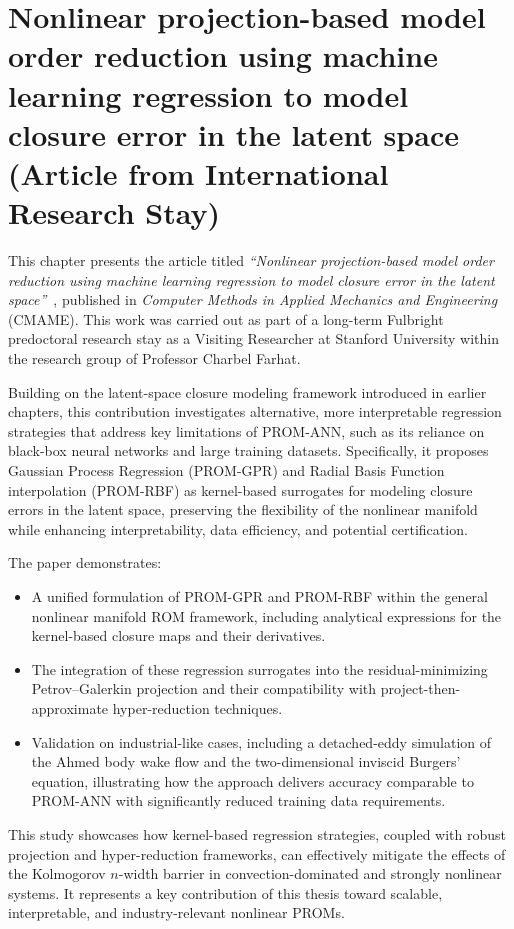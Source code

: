\chapter{Nonlinear projection-based model order reduction using machine learning regression to model closure error in the latent space (Article from International Research Stay)}
\label{chap:article4}
This chapter presents the article titled \emph{``Nonlinear projection-based model order reduction using machine learning regression to model closure error in the latent space''}~\cite{de2025nonlinear}, published in \textit{Computer Methods in Applied Mechanics and Engineering} (CMAME). This work was carried out as part of a long-term Fulbright predoctoral research stay as a Visiting Researcher at Stanford University within the research group of Professor Charbel Farhat.

Building on the latent-space closure modeling framework introduced in earlier chapters, this contribution investigates alternative, more interpretable regression strategies that address key limitations of PROM-ANN, such as its reliance on black-box neural networks and large training datasets. Specifically, it proposes Gaussian Process Regression (PROM-GPR) and Radial Basis Function interpolation (PROM-RBF) as kernel-based surrogates for modeling closure errors in the latent space, preserving the flexibility of the nonlinear manifold while enhancing interpretability, data efficiency, and potential certification.

The paper demonstrates:
\begin{itemize}
    \item A unified formulation of PROM-GPR and PROM-RBF within the general nonlinear manifold ROM framework, including analytical expressions for the kernel-based closure maps and their derivatives.
    \item The integration of these regression surrogates into the residual-minimizing Petrov--Galerkin projection and their compatibility with project-then-approximate hyper-reduction techniques.
    \item Validation on industrial-like cases, including a detached-eddy simulation of the Ahmed body wake flow and the two-dimensional inviscid Burgers' equation, illustrating how the approach delivers accuracy comparable to PROM-ANN with significantly reduced training data requirements.
\end{itemize}

This study showcases how kernel-based regression strategies, coupled with robust projection and hyper-reduction frameworks, can effectively mitigate the effects of the Kolmogorov $n$-width barrier in convection-dominated and strongly nonlinear systems. It represents a key contribution of this thesis toward scalable, interpretable, and industry-relevant nonlinear PROMs.



